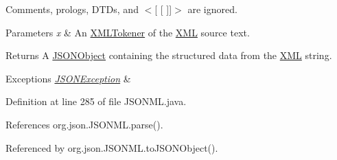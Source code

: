 Comments, prologs, D\-T\-Ds, and {\ttfamily $<$\mbox{[} \mbox{[} \mbox{]}\mbox{]}$>$} are ignored. 
\begin{DoxyParams}{Parameters}
{\em x} & An \hyperlink{classorg_1_1json_1_1_x_m_l_tokener}{X\-M\-L\-Tokener} of the \hyperlink{classorg_1_1json_1_1_x_m_l}{X\-M\-L} source text. \\
\hline
\end{DoxyParams}
\begin{DoxyReturn}{Returns}
A \hyperlink{classorg_1_1json_1_1_j_s_o_n_object}{J\-S\-O\-N\-Object} containing the structured data from the \hyperlink{classorg_1_1json_1_1_x_m_l}{X\-M\-L} string. 
\end{DoxyReturn}

\begin{DoxyExceptions}{Exceptions}
{\em \hyperlink{classorg_1_1json_1_1_j_s_o_n_exception}{J\-S\-O\-N\-Exception}} & \\
\hline
\end{DoxyExceptions}


Definition at line 285 of file J\-S\-O\-N\-M\-L.\-java.



References org.\-json.\-J\-S\-O\-N\-M\-L.\-parse().



Referenced by org.\-json.\-J\-S\-O\-N\-M\-L.\-to\-J\-S\-O\-N\-Object().


